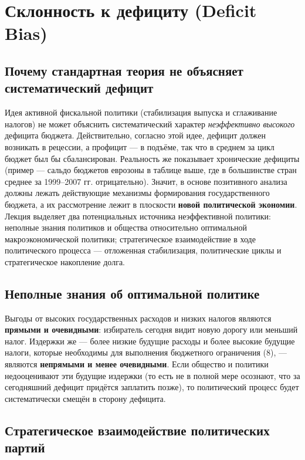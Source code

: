 \documentclass[11pt,a4paper]{article}
\begin{document}
\section{Склонность к дефициту (Deficit Bias)}

\subsection{Почему стандартная теория не объясняет систематический дефицит}

Идея активной фискальной политики (стабилизация выпуска и сглаживание налогов) не может объяснить систематический характер \emph{неэффективно высокого} дефицита бюджета. Действительно, согласно этой идее, дефицит должен возникать в рецессии, а профицит --- в подъёме, так что в среднем за цикл бюджет был бы сбалансирован. Реальность же показывает хронические дефициты (пример --- сальдо бюджетов еврозоны в таблице выше, где в большинстве стран среднее за 1999--2007 гг. отрицательно). Значит, в основе позитивного анализа должны лежать действующие механизмы формирования государственного бюджета, а их рассмотрение лежит в плоскости \textbf{новой политической экономии}. Лекция выделяет два потенциальных источника неэффективной политики: неполные знания политиков и общества относительно оптимальной макроэкономической политики; стратегическое взаимодействие в ходе политического процесса --- отложенная стабилизация, политические циклы и стратегическое накопление долга.

\subsection{Неполные знания об оптимальной политике}

Выгоды от высоких государственных расходов и низких налогов являются \textbf{прямыми и очевидными}: избиратель сегодня видит новую дорогу или меньший налог. Издержки же --- более низкие будущие расходы и более высокие будущие налоги, которые необходимы для выполнения бюджетного ограничения (8), --- являются \textbf{непрямыми и менее очевидными}. Если общество и политики недооценивают эти будущие издержки (то есть не в полной мере осознают, что за сегодняшний дефицит придётся заплатить позже), то политический процесс будет систематически смещён в сторону дефицита.

\subsection{Стратегическое взаимодействие политических партий}
\end{document}
